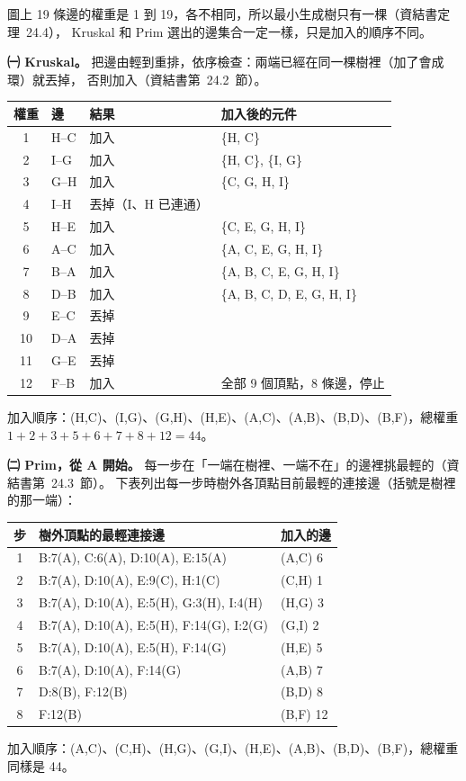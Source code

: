 \begin{pastsoln}
圖上 19 條邊的權重是 1 到 19，各不相同，所以最小生成樹只有一棵（資結書定理~24.4），
Kruskal 和 Prim 選出的邊集合一定一樣，只是加入的順序不同。

\textbf{㈠ Kruskal。} 把邊由輕到重排，依序檢查：兩端已經在同一棵樹裡（加了會成環）就丟掉，
否則加入（資結書第~24.2~節）。
\begin{center}
\begin{tabular}{clll}
\toprule
權重 & 邊 & 結果 & 加入後的元件 \\
\midrule
1 & H--C & 加入 & \{H, C\} \\
2 & I--G & 加入 & \{H, C\}, \{I, G\} \\
3 & G--H & 加入 & \{C, G, H, I\} \\
4 & I--H & 丟掉（I、H 已連通） & \\
5 & H--E & 加入 & \{C, E, G, H, I\} \\
6 & A--C & 加入 & \{A, C, E, G, H, I\} \\
7 & B--A & 加入 & \{A, B, C, E, G, H, I\} \\
8 & D--B & 加入 & \{A, B, C, D, E, G, H, I\} \\
9 & E--C & 丟掉 & \\
10 & D--A & 丟掉 & \\
11 & G--E & 丟掉 & \\
12 & F--B & 加入 & 全部 9 個頂點，8 條邊，停止 \\
\bottomrule
\end{tabular}
\end{center}
加入順序：(H,C)、(I,G)、(G,H)、(H,E)、(A,C)、(A,B)、(B,D)、(B,F)，總權重
$1+2+3+5+6+7+8+12 = 44$。

\textbf{㈡ Prim，從 A 開始。} 每一步在「一端在樹裡、一端不在」的邊裡挑最輕的（資結書第~24.3~節）。
下表列出每一步時樹外各頂點目前最輕的連接邊（括號是樹裡的那一端）：
\begin{center}
\begin{tabular}{cll}
\toprule
步 & 樹外頂點的最輕連接邊 & 加入的邊 \\
\midrule
1 & B:7(A), C:6(A), D:10(A), E:15(A) & (A,C) 6 \\
2 & B:7(A), D:10(A), E:9(C), H:1(C) & (C,H) 1 \\
3 & B:7(A), D:10(A), E:5(H), G:3(H), I:4(H) & (H,G) 3 \\
4 & B:7(A), D:10(A), E:5(H), F:14(G), I:2(G) & (G,I) 2 \\
5 & B:7(A), D:10(A), E:5(H), F:14(G) & (H,E) 5 \\
6 & B:7(A), D:10(A), F:14(G) & (A,B) 7 \\
7 & D:8(B), F:12(B) & (B,D) 8 \\
8 & F:12(B) & (B,F) 12 \\
\bottomrule
\end{tabular}
\end{center}
加入順序：(A,C)、(C,H)、(H,G)、(G,I)、(H,E)、(A,B)、(B,D)、(B,F)，總權重同樣是 44。


\end{pastsoln}
